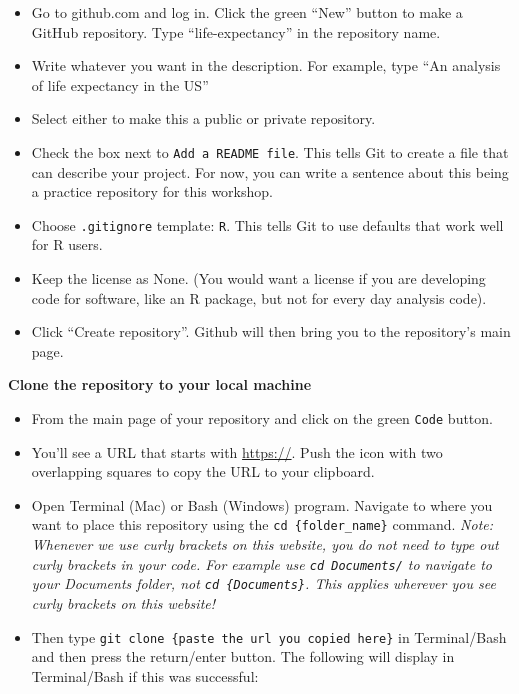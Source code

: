 \documentclass[
]{book}
\providecommand{\tightlist}{%
  \setlength{\itemsep}{0pt}\setlength{\parskip}{0pt}}
\begin{document}
\begin{itemize}
\tightlist
\item
  Go to github.com and log in. Click the green ``New'' button to make a GitHub
  repository. Type ``life-expectancy'' in the repository name.
\item
  Write whatever you want in the description. For example, type ``An analysis of life expectancy in the US''
\item
  Select either to make this a public or private repository.
\item
  Check the box next to \texttt{Add\ a\ README\ file}. This tells Git to create a file that can describe your project. For now, you can write a sentence about this being a practice repository for this workshop.\\
\item
  Choose \texttt{.gitignore} template: \texttt{R}. This tells Git to use defaults that work well for R users.\\
\item
  Keep the license as None. (You would want a license if you are developing code for software, like an R package, but not for every day analysis code).
\item
  Click ``Create repository''. Github will then bring you to the repository's
  main page.
\end{itemize}

\textbf{Clone the repository to your local machine}

\begin{itemize}
\tightlist
\item
  From the main page of your repository and click on the green \texttt{Code} button.\\
\item
  You'll see a URL that starts with \url{https://}. Push the icon with two overlapping
  squares to copy the URL to your clipboard.
\item
  Open Terminal (Mac) or Bash (Windows) program. Navigate to where you want to place
  this repository using the \texttt{cd\ \{folder\_name\}} command. \emph{Note: Whenever we use curly brackets on this website, you do not need to type out curly brackets in your code. For example use \texttt{cd\ Documents/} to navigate to your Documents folder, not \texttt{cd\ \{Documents\}}. This applies wherever you see curly brackets on this website!}
\item
  Then type \texttt{git\ clone\ \{paste\ the\ url\ you\ copied\ here\}} in Terminal/Bash and
  then press the return/enter button. The following will display in Terminal/Bash
  if this was successful:
\end{itemize}
\end{document}
